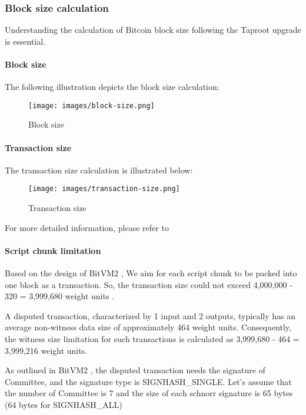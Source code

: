 \subsubsection{Block size calculation}
Understanding the calculation of Bitcoin block size following the Taproot upgrade is essential.

\paragraph{Block size} 

The following illustration depicts the block size calculation:

\begin{figure}[ht] 
    \centering  
    \texttt{[image: images/block-size.png]} 
    \caption{Block size}
    \label{fig:block-size}
\end{figure}

\paragraph*{Transaction size} 

The transaction size calculation is illustrated below:

\begin{figure}[ht] 
    \centering  
    \texttt{[image: images/transaction-size.png]} 
    \caption{Transaction size}
    \label{fig:transaction-size}
\end{figure}

For more detailed information, please refer to \cite{website:transaction-size}

\paragraph*{Script chunk limitation} 

Based on the design of BitVM2 \cite{website:BitVM2}, We aim for each script chunk to be packed into one block as a transaction.
So, the transaction size could not exceed 4,000,000 - 320 = 3,999,680 weight units \cite{website:transaction-size}.

A disputed transaction, characterized by 1 input and 2 outputs, typically has an average non-witness data size of approximately 464 weight units. 
Consequently, the witness size limitation for such transactions is calculated as 3,999,680 - 464 = 3,999,216 weight units.

As outlined in BitVM2 \cite{website:BitVM2}, the disputed transaction needs the signature of Committee, and the signature type is
SIGNHASH\_SINGLE. Let's assume that the number of Committee is 7 and the size of each schnorr signature is 65 bytes (64 bytes for SIGNHASH\_ALL)

